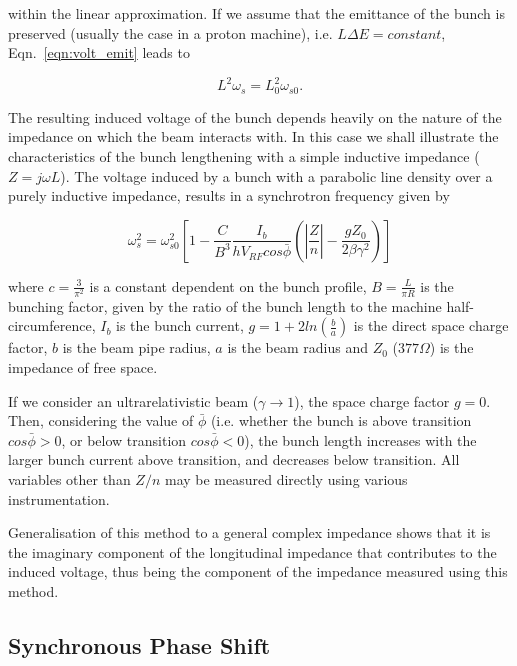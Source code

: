 within the linear approximation. If we assume that the emittance of the bunch is preserved (usually the case in a proton machine), i.e. $L\Delta E = constant$, Eqn.~\ref{eqn:volt_emit} leads to

\begin{equation}
L^{2}\omega_{s} = L_{0}^{2}\omega_{s0}.
\end{equation}

The resulting induced voltage of the bunch depends heavily on the nature of the impedance on which the beam interacts with. In this case we shall illustrate the characteristics of the bunch lengthening with a simple inductive impedance ($Z = j\omega L$). The voltage induced by a bunch with a parabolic line density over a purely inductive impedance, results in a synchrotron frequency given by

\begin{equation}
\omega_{s}^{2} = \omega_{s0}^{2}\left[ 1 - \frac{C}{B^{3}} \frac{I_{b}}{hV_{RF}cos\bar{\phi}} \left( \left| \frac{Z}{n}  \right| - \frac{gZ_{0}}{2\beta\gamma^{2}}   \right)    \right]
\end{equation}

where $c = \frac{3}{\pi^{2}}$ is a constant dependent on the bunch profile, $B = \frac{L}{\pi R}$ is the bunching
factor, given by the ratio of the bunch length to the machine half-circumference, $I_{b}$ is the bunch current, $g = 1 + 2ln\left(\frac{b}{a} \right)$ is the direct space charge factor, $b$ is the beam pipe radius, $a$ is the beam radius and $Z_{0}$ ($377\Omega$) is the impedance of free space.

If we consider an ultrarelativistic beam ($\gamma \rightarrow 1$), the space charge factor $g = 0$. Then, considering the value of $\bar{\phi}$ (i.e. whether the bunch is above transition $cos\bar{\phi} > 0$, or below transition $cos\bar{\phi} < 0$), the bunch length increases with the larger bunch current above transition, and decreases below transition. All variables other than $Z/n$ may be measured directly using various instrumentation.

Generalisation of this method to a general complex impedance shows that it is the imaginary component of the longitudinal impedance that contributes to the induced voltage, thus being the component of the impedance measured using this method.

\subsection{Synchronous Phase Shift}
\label{sec:syn-phase-shift}

